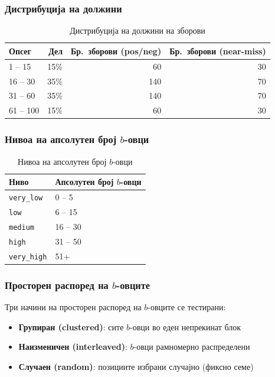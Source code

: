 \documentclass[12pt,a4paper]{article}
\theoremstyle{definition}
\begin{document}
\subsubsection{Дистрибуција на должини}

\begin{table}[H]
\centering
\begin{tabular}{lrrr}
\toprule
\textbf{Опсег} & \textbf{Дел} & \textbf{Бр.\ зборови (pos/neg)} & \textbf{Бр.\ зборови (near-miss)} \\
\midrule
1 -- 15   & 15\% & 60  & 30  \\
16 -- 30  & 35\% & 140 & 70  \\
31 -- 60  & 35\% & 140 & 70  \\
61 -- 100 & 15\% & 60  & 30  \\
\bottomrule
\end{tabular}
\caption{Дистрибуција на должини на зборови}
\end{table}

\subsubsection{Нивоа на апсолутен број $b$-овци}

\begin{table}[H]
\centering
\begin{tabular}{ll}
\toprule
\textbf{Ниво} & \textbf{Апсолутен број $b$-овци} \\
\midrule
\texttt{very\_low}  & 0 -- 5   \\
\texttt{low}        & 6 -- 15  \\
\texttt{medium}     & 16 -- 30 \\
\texttt{high}       & 31 -- 50 \\
\texttt{very\_high} & 51+      \\
\bottomrule
\end{tabular}
\caption{Нивоа на апсолутен број $b$-овци}
\end{table}

\subsubsection{Просторен распоред на $b$-овците}

Три начини на просторен распоред на $b$-овците се тестирани:

\begin{itemize}
  \item \textbf{Групиран (clustered)}: сите $b$-овци во еден непрекинат блок
  \item \textbf{Наизменичен (interleaved)}: $b$-овци рамномерно распределени
  \item \textbf{Случаен (random)}: позициите избрани случајно (фиксно семе)
\end{itemize}
\end{document}
